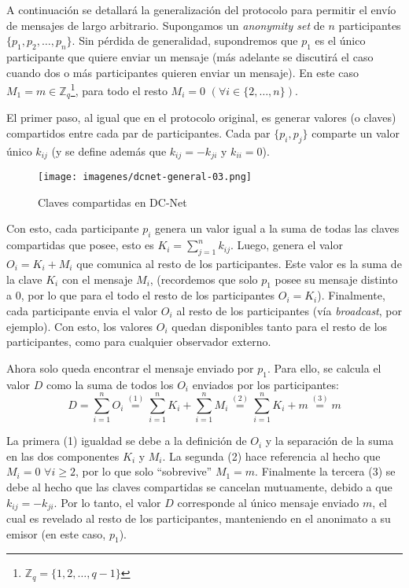 A continuación se detallará la generalización del protocolo para permitir el 
envío de mensajes de largo arbitrario. Supongamos un \emph{anonymity set} de 
$n$ participantes $\{p_1, p_2, \ldots, p_n\}$. Sin pérdida de generalidad, 
supondremos que $p_1$ es el único participante que quiere enviar un mensaje 
(más adelante se discutirá el caso cuando dos o más participantes quieren 
enviar un mensaje). En este caso $M_1 = m \in 
\mathbb{Z}_q$\footnote{$\mathbb{Z}_q = \{1, 2, \ldots, q - 1\}$}, para todo el 
resto $M_i = 0$ $(\forall i \in \{2, \ldots, n\})$.

El primer paso, al igual que en el protocolo original, es generar valores (o 
claves) compartidos entre cada par de participantes. Cada par $\{p_i, p_j\}$ 
comparte un valor único $k_{ij}$ (y se define además que $k_{ij} = -k_{ji}$ y 
$k_{ii} = 0$).

\begin{figure}[H]
  \centering
    \texttt{[image: imagenes/dcnet-general-03.png]}
  \caption{Claves compartidas en DC-Net}
\end{figure}

Con esto, cada participante $p_i$ genera un valor igual a la suma de todas las 
claves compartidas que posee, esto es $K_i = \sum_{j=1}^n k_{ij}$. 
Luego, genera el valor $O_i = K_i + M_i$ que comunica al resto de los 
participantes. Este valor es la suma de la clave $K_i$ con el mensaje $M_i$, 
(recordemos que solo $p_1$ posee su mensaje distinto a 0, por lo que para el 
todo el resto de los participantes $O_i = K_i$). Finalmente, cada participante 
envia el valor $O_i$ al resto de los participantes (vía \emph{broadcast}, por 
ejemplo). Con esto, los valores $O_i$ quedan disponibles tanto para el resto 
de los participantes, como para cualquier observador externo.

Ahora solo queda encontrar el mensaje enviado por $p_1$. Para ello, se calcula 
el valor $D$ como la suma de todos los $O_i$ enviados por los participantes: 
$$D = \sum_{i=1}^n O_i \overset{(1)}{=} \sum_{i=1}^n K_i + \sum_{i=1}^n M_i 
\overset{(2)}{=} \sum_{i=1}^n K_i + m \overset{(3)}{=} m$$

La primera (1) igualdad se debe a la definición de $O_i$ y la separación de la 
suma en las dos componentes $K_i$ y $M_i$. La segunda (2) hace referencia al 
hecho que $M_i = 0$ $\forall i \geq 2$, por lo que solo ``sobrevive'' 
$M_1 = m$. Finalmente la tercera (3) se debe al hecho que las claves 
compartidas se cancelan mutuamente, debido a que $k_{ij} = -k_{ji}$. Por lo 
tanto, el valor $D$ corresponde al único mensaje enviado $m$, el cual es 
revelado al resto de los participantes, manteniendo en el anonimato a su 
emisor (en este caso, $p_1$).

